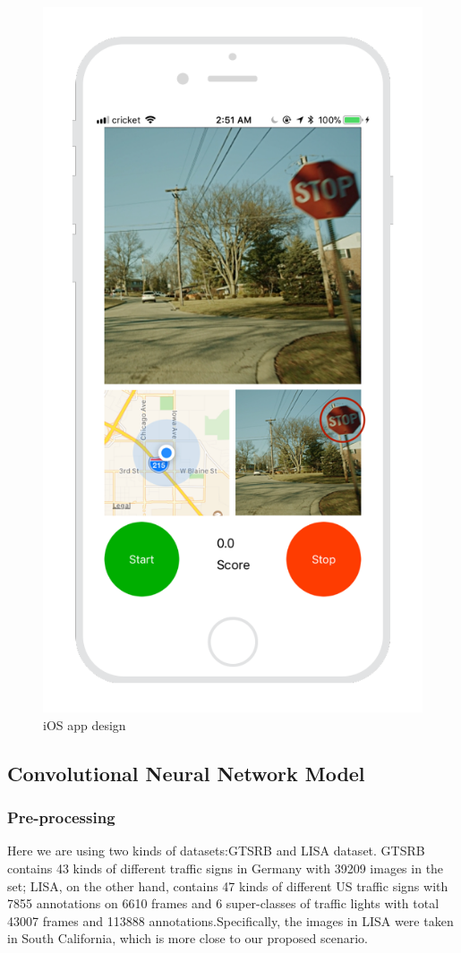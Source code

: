\documentclass[conference]{IEEEtran}
\begin{document}
\begin{figure}[H]
  \begin{minipage}{.4\textwidth}
    \centering
    \includegraphics[width=0.6\linewidth]{iOS_design.png}
    \caption{iOS app design}
    \label{fig:fig_1}
  \end{minipage}
\end{figure}

\subsection{Convolutional Neural Network Model}

\subsubsection{Pre-processing}
Here we are using two kinds of datasets:GTSRB and LISA dataset. GTSRB contains 43 kinds of different traffic signs in Germany with 39209 images in the set; LISA, on the other hand, contains 47 kinds of different US traffic signs with 7855 annotations on 6610 frames and 6 super-classes of traffic lights with total 43007 frames and 113888 annotations.Specifically, the images in LISA  were taken in South California, which is more close to our proposed scenario.
\end{document}
